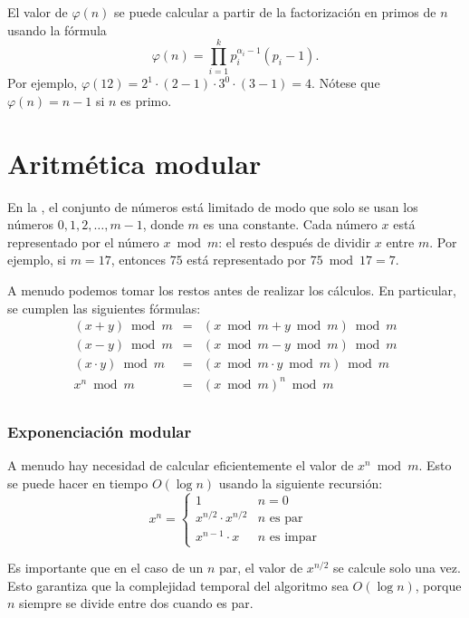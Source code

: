El valor de $\varphi(n)$ se puede calcular
a partir de la factorización en primos de $n$
usando la fórmula
\[ \varphi(n) = \prod_{i=1}^k p_i^{\alpha_i-1}(p_i-1). \]
Por ejemplo, $\varphi(12)=2^1 \cdot (2-1) \cdot 3^0 \cdot (3-1)=4$.
Nótese que $\varphi(n)=n-1$ si $n$ es primo.

\section{Aritmética modular}


En la ,
el conjunto de números está limitado de modo
que solo se usan los números $0,1,2,\ldots,m-1$,
donde $m$ es una constante.
Cada número $x$ está
representado por el número $x \bmod m$:
el resto después de dividir $x$ entre $m$.
Por ejemplo, si $m=17$, entonces $75$
está representado por $75 \bmod 17 = 7$.

A menudo podemos tomar los restos antes de realizar
los cálculos.
En particular, se cumplen las siguientes fórmulas:
\[
\begin{array}{rcl}
(x+y) \bmod m & = & (x \bmod m + y \bmod m) \bmod m \\
(x-y) \bmod m & = & (x \bmod m - y \bmod m) \bmod m \\
(x \cdot y) \bmod m & = & (x \bmod m \cdot y \bmod m) \bmod m \\
x^n \bmod m & = & (x \bmod m)^n \bmod m \\
\end{array}
\]

\subsubsection{Exponenciación modular}

A menudo hay necesidad de calcular eficientemente
el valor de $x^n \bmod m$.
Esto se puede hacer en tiempo $O(\log n)$
usando la siguiente recursión:
\begin{equation*}
    x^n = \begin{cases}
               1        & n = 0\\
               x^{n/2} \cdot x^{n/2} & \text{$n$ es par}\\
               x^{n-1} \cdot x & \text{$n$ es impar}
           \end{cases}
\end{equation*}

Es importante que en el caso de un $n$ par,
el valor de $x^{n/2}$ se calcule solo una vez.
Esto garantiza que la complejidad temporal del
algoritmo sea $O(\log n)$, porque $n$ siempre se divide entre dos
cuando es par.

